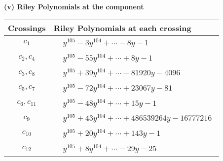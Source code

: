 \documentclass[1p]{elsarticle_modified}
\theoremstyle{definition}
\begin{document}
\newpage\renewcommand{\arraystretch}{1}
\flushleft \textbf{(v) Riley Polynomials at the component}\newline \\
\begin{tabular}{m{50pt}|m{274pt}}
Crossings & \hspace{64pt}Riley Polynomials at each crossing \\
\hline $$\begin{aligned}c_{1}\end{aligned}$$&$\begin{aligned}
&y^{105}-3 y^{104}+\cdots-8 y-1
\end{aligned}$\\
\hline $$\begin{aligned}c_{2},c_{4}\end{aligned}$$&$\begin{aligned}
&y^{105}-55 y^{104}+\cdots+8 y-1
\end{aligned}$\\
\hline $$\begin{aligned}c_{3},c_{8}\end{aligned}$$&$\begin{aligned}
&y^{105}+39 y^{104}+\cdots-81920 y-4096
\end{aligned}$\\
\hline $$\begin{aligned}c_{5},c_{7}\end{aligned}$$&$\begin{aligned}
&y^{105}-72 y^{104}+\cdots+23067 y-81
\end{aligned}$\\
\hline $$\begin{aligned}c_{6},c_{11}\end{aligned}$$&$\begin{aligned}
&y^{105}-48 y^{104}+\cdots+15 y-1
\end{aligned}$\\
\hline $$\begin{aligned}c_{9}\end{aligned}$$&$\begin{aligned}
&y^{105}+43 y^{104}+\cdots+486539264 y-16777216
\end{aligned}$\\
\hline $$\begin{aligned}c_{10}\end{aligned}$$&$\begin{aligned}
&y^{105}+20 y^{104}+\cdots+143 y-1
\end{aligned}$\\
\hline $$\begin{aligned}c_{12}\end{aligned}$$&$\begin{aligned}
&y^{105}+8 y^{104}+\cdots-29 y-25
\end{aligned}$\\
\hline
\end{tabular}\\~\\
\end{document}
